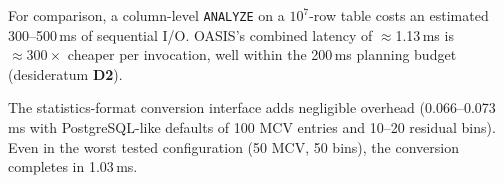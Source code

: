\documentclass[runningheads]{llncs}
\begin{document}
For comparison, a column-level \texttt{ANALYZE} on a $10^7$-row table costs an
estimated 300--500\,ms of sequential I/O. OASIS's combined latency of
$\approx$1.13\,ms is ${\approx}300\times$ cheaper per invocation, well within
the 200\,ms planning budget (desideratum \textbf{D2}).

The statistics-format conversion interface adds negligible overhead
(0.066--0.073\,ms with PostgreSQL-like defaults of 100 MCV entries and 10--20
residual bins). Even in the worst tested configuration (50 MCV, 50 bins), the
conversion completes in 1.03\,ms.



\end{document}
